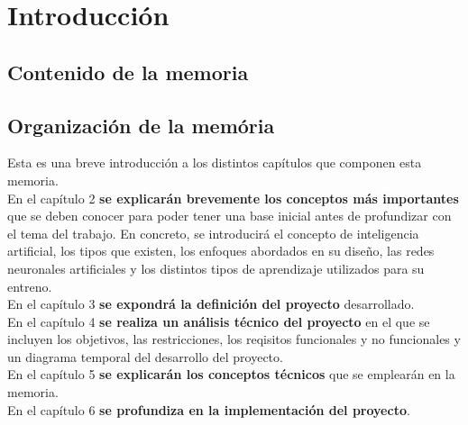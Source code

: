 
\chapter{Introducción}\label{introduccion}


\section{Contenido de la memoria}

\section{Organización de la memória}

Esta es una breve introducción a los distintos capítulos que componen esta memoria. \\

En el capítulo 2 \textbf{se explicarán brevemente los conceptos más importantes} que se deben conocer para poder tener una base inicial antes de profundizar con el tema del trabajo. En concreto, se introducirá el concepto de inteligencia artificial, los tipos que existen, los enfoques abordados en su diseño, las redes neuronales artificiales y los distintos tipos de aprendizaje utilizados para su entreno. \\

En el capítulo 3 \textbf{se expondrá la definición del proyecto} desarrollado. \\

En el capítulo 4 \textbf{se realiza un análisis técnico del proyecto} en el que se incluyen los objetivos, las restricciones, los reqisitos funcionales y no funcionales y un diagrama temporal del desarrollo del proyecto. \\

En el capítulo 5 \textbf{se explicarán los conceptos técnicos} que se emplearán en la memoria. \\

En el capítulo 6 \textbf{se profundiza en la implementación del proyecto}. \\